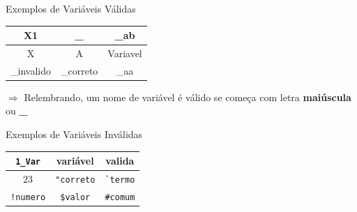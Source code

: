 
\begin{frame}[fragile]
	
	\begin{block}{Exemplos de Variáveis Válidas}
		
		\begin{center}
			\begin{tabular}{c|c|c}\hline
				X1 & \textbf{\_} & \_ab \\ \hline
				X & A & Variavel \\ \hline
				\_invalido & \_correto & \_aa \\ \hline
			\end{tabular}
		\end{center}
		
	$\Rightarrow $	Relembrando, um nome de variável é válido se começa com letra \textbf{maiúscula} ou \textbf{\_}
		
	\end{block}
	
\end{frame}


\begin{frame}[fragile]
	
	\begin{block}{Exemplos de Variáveis Inválidas}
		
		\begin{center}
			\begin{tabular}{c|c|c}\hline
				\verb!1_Var! & variável & valida\\ \hline
				$23$ & \verb!"correto! & \verb!`termo!\\ \hline
				\verb+!numero+ & \verb!$valor! & \verb!#comum!\\ \hline
			\end{tabular}
		\end{center}
		
		
	\end{block}
	
\end{frame}


